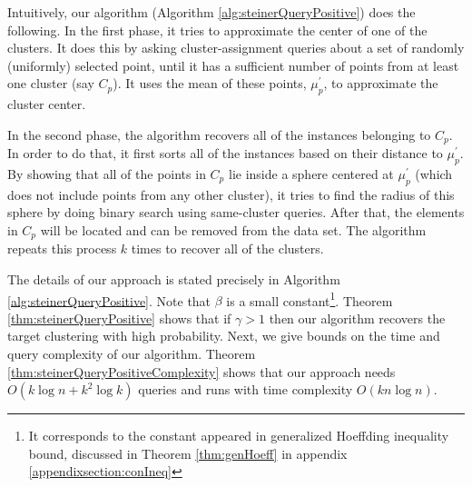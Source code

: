 \documentclass{article}
\begin{document}
Intuitively, our algorithm (Algorithm  \ref{alg:steinerQueryPositive}) does the following. In the first phase, it tries to approximate the center of one of the clusters. It does this by asking cluster-assignment queries about a set of randomly (uniformly) selected point, until it has a sufficient number of points from at least one cluster (say $C_p$). It uses the mean of these points, $\mu_p^\prime$, to approximate the cluster center. 

In the second phase, the algorithm recovers all of the instances belonging to $C_p$. In order to do that, it first sorts all of the instances based on their distance to $\mu_p^\prime$. By showing that all of the points in $C_p$ lie inside a sphere centered at $\mu_p^\prime$ (which does not include points from any other cluster), it tries to find the radius of this sphere by doing binary search using same-cluster queries. After that, the elements in $C_p$ will be located and can be removed from the data set. The algorithm repeats this process $k$ times to recover all of the clusters.



The details of our approach is stated precisely in Algorithm \ref{alg:steinerQueryPositive}. Note that $\beta$ is a small constant\footnote{It corresponds to the constant appeared in generalized Hoeffding inequality bound, discussed in Theorem \ref{thm:genHoeff} in appendix \ref{appendixsection:conIneq}}. Theorem \ref{thm:steinerQueryPositive} shows that if $\gamma > 1$ then our algorithm recovers the target clustering with high probability. Next, we give bounds on the time and query complexity of our algorithm. Theorem \ref{thm:steinerQueryPositiveComplexity} shows that our approach needs $O(k\log n + k^2\log k)$ queries and runs with time complexity $O(kn\log n)$.
\end{document}
